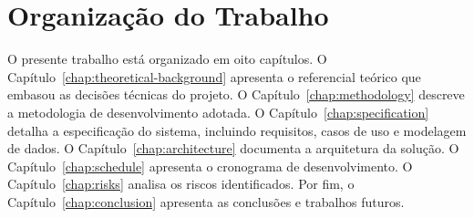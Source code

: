 \section{Organização do Trabalho}
\label{sec:organization}

O presente trabalho está organizado em oito capítulos. O
Capítulo~\ref{chap:theoretical-background} apresenta o
referencial teórico que embasou as decisões técnicas do projeto.
O Capítulo~\ref{chap:methodology} descreve a metodologia de
desenvolvimento adotada. O Capítulo~\ref{chap:specification}
detalha a especificação do sistema, incluindo requisitos,
casos de uso e modelagem de dados. O
Capítulo~\ref{chap:architecture} documenta a arquitetura
da solução. O Capítulo~\ref{chap:schedule} apresenta o
cronograma de desenvolvimento. O Capítulo~\ref{chap:risks}
analisa os riscos identificados. Por fim, o
Capítulo~\ref{chap:conclusion} apresenta as conclusões e
trabalhos futuros.